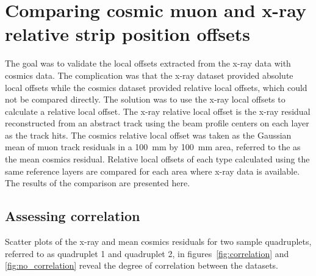 
\chapter{Comparing cosmic muon and x-ray relative strip position offsets}
\label{chap:comparison}

The goal was to validate the local offsets extracted from the x-ray data with cosmics data. The complication was that the x-ray dataset provided absolute local offsets while the cosmics dataset provided relative local offsets, which could not be compared directly. The solution was to use the x-ray local offsets to calculate a relative local offset. The x-ray relative local offset is the x-ray residual reconstructed from an abstract track using the beam profile centers on each layer as the track hits. The cosmics relative local offset was taken as the Gaussian mean of muon track residuals in a \SI{100}{mm} by \SI{100}{mm} area, referred to the as the mean cosmics residual. Relative local offsets of each type calculated using the same reference layers are compared for each area where x-ray data is available. The  results of the comparison are presented here.


\section{Assessing correlation}
\label{sec:assessing_correlation}
Scatter plots of the x-ray and mean cosmics residuals for two sample quadruplets, referred to as quadruplet 1 and quadruplet 2, in figures~\ref{fig:correlation} and \ref{fig:no_correlation} reveal the degree of correlation between the datasets. 

